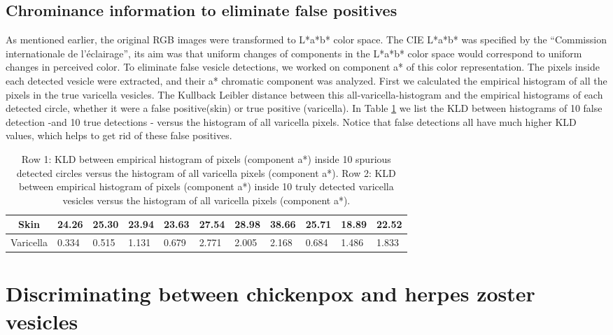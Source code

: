 \documentclass[oribibl]{llncs}
\begin{document}
\subsection{Chrominance information to eliminate false positives}
 As mentioned earlier, the original RGB images were transformed to L*a*b* color space. The CIE L*a*b* was specified by the ``Commission internationale de l'éclairage'',  
its aim was that uniform changes of components in the L*a*b* color space would correspond to uniform changes in perceived color.
To eliminate false vesicle detections, we worked on component a* of this color representation. 
The pixels inside each detected vesicle were extracted, and their a* chromatic component was analyzed. 
First we calculated the empirical histogram of all the pixels in the true varicella vesicles.
The Kullback Leibler distance between this all-varicella-histogram and the empirical histograms of each detected circle, whether it were a false positive(skin) or true positive (varicella). 
In Table \ref{tabla} we list the KLD between histograms of 10 false detection -and 10 true detections - versus the histogram of all varicella pixels. Notice that false detections all have much higher KLD values, which helps to 
get rid of these false positives.

\begin{table}%
\centering
\begin{tabular}{@{\quad}c|@{\quad}l@{\quad}l@{\quad}l@{\quad}l@{\quad}l@{\quad}l@{\quad}l@{\quad}l@{\quad}l@{\quad}l}
  Skin &  24.26 &   25.30   & 23.94   & 23.63  & 27.54   & 28.98      & 38.66       & 25.71    & 18.89  & 22.52    \\ \hline
Varicella  & 0.334 &  0.515  &  1.131   &  0.679   &  2.771   &  2.005    &   2.168     &  0.684    & 1.486   &  1.833
\end{tabular}
\vspace{0.1in}
\caption{\small{Row 1: KLD between empirical histogram of pixels (component a*) inside 10 spurious detected circles versus the histogram of all varicella pixels (component a*).
Row 2: KLD between empirical histogram of pixels (component a*) inside 10 truly detected varicella vesicles versus the histogram of all varicella pixels (component a*).} \label{tabla} }
\end{table}

\section{Discriminating between chickenpox and herpes zoster vesicles}
\end{document}
